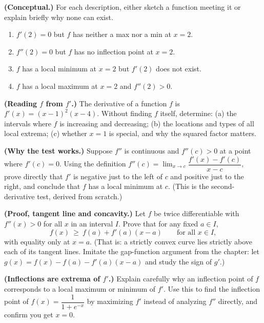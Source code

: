 \begin{exercise}\label{ch16:exE}
\textbf{(Conceptual.)} For each description, either sketch a function meeting it or
explain briefly why none can exist.
\begin{enumerate}
\item $f'(2)=0$ but $f$ has neither a max nor a min at $x=2$.
\item $f''(2)=0$ but $f$ has no inflection point at $x=2$.
\item $f$ has a local minimum at $x=2$ but $f'(2)$ does not exist.
\item $f$ has a local maximum at $x=2$ and $f''(2)>0$.
\end{enumerate}
\end{exercise}

\begin{exercise}\label{ch16:exF}
\textbf{(Reading $f$ from $f'$.)} The derivative of a function $f$ is
$f'(x)=(x-1)^2(x-4)$. Without finding $f$ itself, determine: (a) the intervals
where $f$ is increasing and decreasing; (b) the locations and types of all local
extrema; (c) whether $x=1$ is special, and why the squared factor matters.
\end{exercise}

\begin{exercise}\label{ch16:exG}
\textbf{(Why the test works.)} Suppose $f''$ is continuous and $f''(c)>0$ at a point
where $f'(c)=0$. Using the definition $f''(c)=\lim_{x\to
c}\dfrac{f'(x)-f'(c)}{x-c}$, prove directly that $f'$ is negative just to the left
of $c$ and positive just to the right, and conclude that $f$ has a local minimum at
$c$. (This is the second-derivative test, derived from scratch.)
\end{exercise}

\begin{exercise}\label{ch16:exH}
\textbf{(Proof, tangent line and concavity.)} Let $f$ be twice differentiable with
$f''(x)>0$ for all $x$ in an interval $I$. Prove that for any fixed $a\in I$,
\[
f(x)\ \ge\ f(a)+f'(a)(x-a)\qquad\text{for all } x\in I,
\]
with equality only at $x=a$. (That is: a strictly convex curve lies strictly above
each of its tangent lines. Imitate the gap-function argument from the chapter:
let $g(x)=f(x)-f(a)-f'(a)(x-a)$ and study the sign of $g'$.)
\end{exercise}

\begin{exercise}\label{ch16:exI}
\textbf{(Inflections are extrema of $f'$.)} Explain carefully why an inflection
point of $f$ corresponds to a local maximum or minimum of $f'$. Use this to find
the inflection point of $f(x)=\dfrac{1}{1+e^{-x}}$ by maximizing $f'$ instead of
analyzing $f''$ directly, and confirm you get $x=0$.
\end{exercise}

